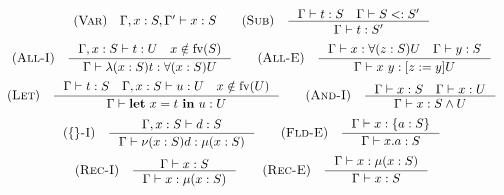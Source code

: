 \[\begin{array}{c}
    \RULE{Var} \quad \TJT{\Gamma, x: S, \Gamma'}{x}{S} \qquad

    \RULE{Sub} \quad \inference{
        \TJT{\Gamma}{t}{S} \quad
        \SJT{\Gamma}{S}{S'}
    }{
        \TJT{\Gamma}{t}{S'}
    } \\[4mm]

    \RULE{All-I} \quad \inference{
        \TJT{\Gamma, x: S}{t}{U} \quad
        x \notin \FV{S}
    }{
        \TJT{\Gamma}{\ABS{x}{S}{t}}{\DFUN{x}{S}{U}}
    } \qquad

    \RULE{All-E} \quad \inference{
        \TJT{\Gamma}{x}{\DFUN{z}{S}{U}} \quad
        \TJT{\Gamma}{y}{S}
    }{
        \TJT{\Gamma}{x\ y}{\SUB{z}{y}U}
    } \\[4mm]

    \RULE{Let} \quad \inference{
        \TJT{\Gamma}{t}{S} \quad
        \TJT{\Gamma, x: S}{u}{U} \quad
        x \notin \FV{U}
    }{
        \TJT{\Gamma}{\LET{x}{t}{u}}{U}
    } \qquad

    \RULE{And-I} \quad \inference{
        \TJT{\Gamma}{x}{S} \quad
        \TJT{\Gamma}{x}{U}
    }{
        \TJT{\Gamma}{x}{\AGG{S}{U}}
    } \\[4mm]

    \RULE{\{\}-I} \quad \inference{
        \TJT{\Gamma, x: S}{d}{S}
    }{
        \TJT{\Gamma}{\OBJ{x}{S}{d}}{\REC{x}{S}}
    } \qquad

    \RULE{Fld-E} \quad \inference{
        \TJT{\Gamma}{x}{\FDEC{a}{S}}
    }{
        \TJT{\Gamma}{x.a}{S}
    } \\[4mm]

    \RULE{Rec-I} \quad \inference{
        \TJT{\Gamma}{x}{S}
    }{
        \TJT{\Gamma}{x}{\REC{x}{S}}
    } \qquad

    \RULE{Rec-E} \quad \inference{
        \TJT{\Gamma}{x}{\REC{x}{S}}
    }{
        \TJT{\Gamma}{x}{S}
    }
\end{array}\]
